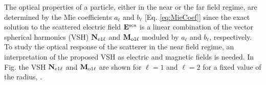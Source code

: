 
The optical properties of a particle, either in the near or the far field regime,  are determined by the Mie coefficients   $a_\ell$ and $b_\ell$ [Eq. \eqref{eq:MieCoef}] since the exact solution to the scattered electric field $\vb{E}^\text{sca}$ is a linear combination of the vector spherical harmonics (VSH) $\vb{N}_{\text{e}1\ell}$ and $\vb{M}_{\text{o}1\ell}$ moduled by  $a_\ell$ and $b_\ell$, respectively. To study the optical response of the scatterer in the near field regime, an interpretation of the proposed VSH as electric and magnetic fields is needed. In Fig. {} the VSH $\vb{N}_{\text{e}1\ell}$ and $\vb{M}_{\text{o}1\ell}$ are shown for $\ell = 1$ and $\ell = 2$ for a fixed value of the radius,  {}.


